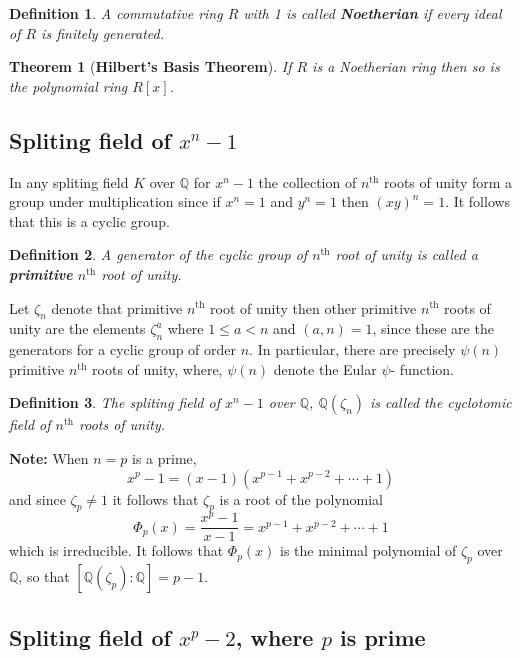 \documentclass[answers, a4paper, 12pt]{exam}
\newtheorem{theorem}{Theorem}[section]
\newtheorem{definition}{Definition}
\newcommand{\Q}{\mathbb{Q}}
\begin{document}
\begin{definition}
    A commutative ring $R$ with 1 is called \textbf{Noetherian} if every ideal of $R$ is finitely generated.
\end{definition}

\begin{theorem}[\textbf{Hilbert's Basis Theorem}]
    If $R$ is a Noetherian ring then so is the polynomial ring $R[x]$.
\end{theorem}

\subsection{Spliting field of $x^n-1$}
In any spliting field $K$ over $\Q$ for $x^n-1$ the collection of $n^{\text{th}}$ roots of unity form a group under multiplication since if $x^n=1$ and $y^n=1$ then $(xy)^n=1$. It follows that this is a cyclic group.
\begin{definition}
    A generator of the cyclic group of $n^{\text{th}}$ root of unity is called a \textbf{primitive} $n^{\text{th}}$ root of unity.
\end{definition}
Let $\zeta_n$ denote that primitive $n^{\text{th}}$ root of unity then other primitive $n^{\text{th}}$ roots of unity are the elements $\zeta^a_n$ where $1\leq a<n$ and $(a,n)=1$, since these are the generators for a cyclic group of order $n$. In particular, there are precisely $\psi(n)$ primitive $n^{\text{th}}$ roots of unity, where, $\psi(n)$ denote the Eular $\psi$- function.
\begin{definition}
    The spliting field of $x^n-1$ over $\Q$, $\Q(\zeta_n)$ is called the cyclotomic field of $n^{\text{th}}$ roots of unity.
\end{definition}
\textbf{Note:} When $n=p$ is a prime,
$$x^p-1=(x-1)(x^{p-1}+x^{p-2}+\cdots+1)$$
and since $\zeta_p\neq 1$ it follows that $\zeta_p$ is a root of the polynomial
$$\Phi_p(x)=\frac{x^p-1}{x-1}=x^{p-1}+x^{p-2}+\cdots+1$$
which is irreducible. It follows that $\Phi_p(x)$ is the minimal polynomial of $\zeta_p$ over $\Q$, so that $[\Q(\zeta_p):\Q]=p-1$.

\subsection{Spliting field of $x^p-2$, where $p$ is prime}
\end{document}

